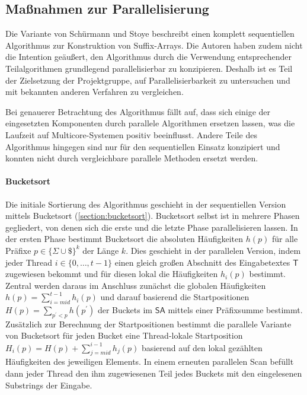 \subsection{Maßnahmen zur Parallelisierung}
\label{bpr:parallelisierung}
\newcommand{\ltr}[1]{\ensuremath{ltr(\mathsf{b}_{#1})}\xspace}
\newcommand{\rtl}[1]{\ensuremath{rtl(\mathsf{b}_{#1})}\xspace}

Die \bpr Variante von Schürmann und Stoye \cite{saca:2} beschreibt einen komplett sequentiellen Algorithmus zur Konstruktion von {Suf\-fix}-Arrays.
Die Autoren haben zudem nicht die Intention geäußert, den Algorithmus durch die Verwendung entsprechender Teilalgorithmen grundlegend parallelisierbar zu konzipieren.
Deshalb ist es Teil der Zielsetzung der Projektgruppe, \bpr auf Parallelisierbarkeit zu untersuchen und mit bekannten anderen Verfahren zu vergleichen.\par\smallskip
Bei genauerer Betrachtung des Algorithmus fällt auf, dass sich einige der eingesetzten Komponenten durch parallele Algorithmen ersetzen lassen, was die Laufzeit auf Multicore-Systemen positiv beeinflusst.
Andere Teile des Algorithmus hingegen sind nur für den sequentiellen Einsatz konzipiert und konnten nicht durch vergleichbare parallele Methoden ersetzt werden.

\paragraph{Bucketsort}
Die initiale Sortierung des \bpr Algorithmus geschieht in der sequentiellen Version mittels Bucketsort (\cref{section:bucketsort}).
Bucketsort selbst ist in mehrere Phasen gegliedert, von denen sich die erste und die letzte Phase parallelisieren lassen.
In der ersten Phase bestimmt Bucketsort die absoluten Häufigkeiten \(h(p)\) für alle Präfixe \(p \in \{\Sigma \cup \$\}^k\) der Länge \(k\).
Dies geschieht in der parallelen Version, indem jeder Thread \(i \in \{0, \ldots, t-1\}\) einen gleich großen Abschnitt des Eingabetextes \(\mathsf{T}\) zugewiesen bekommt und für diesen lokal die Häufigkeiten \(h_i(p)\) bestimmt.
Zentral werden daraus im Anschluss zunächst die globalen Häufigkeiten \(h(p) = \sum_{i=mid}^{t-1} h_i(p)\) und darauf basierend die Startpositionen \(H(p) = \sum_{p^\prime < p} h(p^\prime)\) der Buckets im \(\mathsf{SA}\) mittels einer Präfixsumme bestimmt.
Zusätzlich zur Berechnung der Startpositionen bestimmt die parallele Variante von Bucketsort für jeden Bucket eine Thread-lokale Startposition \(H_i(p) = H(p) + \sum_{j=mid}^{i-1} h_j(p)\) basierend auf den lokal gezählten Häufigkeiten des jeweiligen Elements.
In einem erneuten parallelen Scan befüllt dann jeder Thread den ihm zugewiesenen Teil jedes Buckets mit den eingelesenen Substrings der Eingabe.

